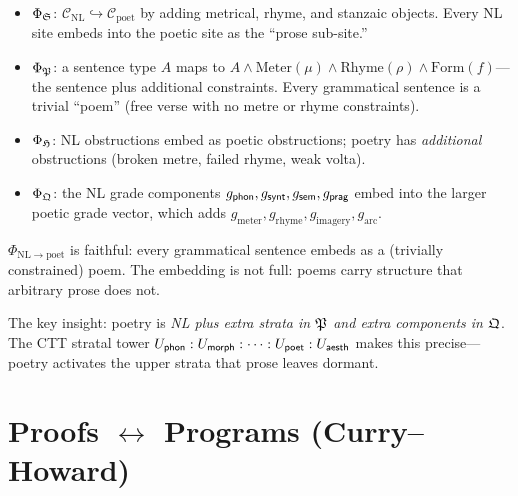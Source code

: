 \begin{construction}
\label{con:nl-poet}
\begin{itemize}[nosep]
  \item $\Phi_{\mathfrak{S}}$: $\mathcal{C}_{\mathrm{NL}}\hookrightarrow
    \mathcal{C}_{\mathrm{poet}}$ by adding metrical, rhyme, and
    stanzaic objects.  Every NL site embeds into the poetic site as
    the ``prose sub-site.''
  \item $\Phi_{\mathfrak{P}}$: a sentence type $A$ maps to
    $A\wedge\mathrm{Meter}(\mu)\wedge\mathrm{Rhyme}(\rho)\wedge
    \mathrm{Form}(f)$---the sentence plus additional constraints.
    Every grammatical sentence is a trivial ``poem'' (free verse
    with no metre or rhyme constraints).
  \item $\Phi_{\mathfrak{H}}$: NL obstructions embed as poetic
    obstructions; poetry has \emph{additional} obstructions
    (broken metre, failed rhyme, weak volta).
  \item $\Phi_{\mathfrak{Q}}$: the NL grade components
    $g_{\mathsf{phon}},g_{\mathsf{synt}},g_{\mathsf{sem}},g_{\mathsf{prag}}$ embed into the
    larger poetic grade vector, which adds
    $g_{\mathrm{meter}},g_{\mathrm{rhyme}},g_{\mathrm{imagery}},
    g_{\mathrm{arc}}$.
\end{itemize}
\end{construction}

\begin{theorem}
\label{thm:nl-poet-embed}
$\Phi_{\mathrm{NL}\to\mathrm{poet}}$ is faithful: every
grammatical sentence embeds as a (trivially constrained) poem.
The embedding is not full: poems carry structure that arbitrary
prose does not.
\end{theorem}

The key insight: poetry is \emph{NL plus extra strata in $\mathfrak{P}$
and extra components in $\mathfrak{Q}$}.  The CTT stratal tower
$U_{\mathsf{phon}}:U_{\mathsf{morph}}:\cdots:U_{\mathsf{poet}}:U_{\mathsf{aesth}}$ makes this
precise---poetry activates the upper strata that prose leaves
dormant.

\section{Proofs $\leftrightarrow$ Programs (Curry--Howard)}
\label{sec:math-prog}

